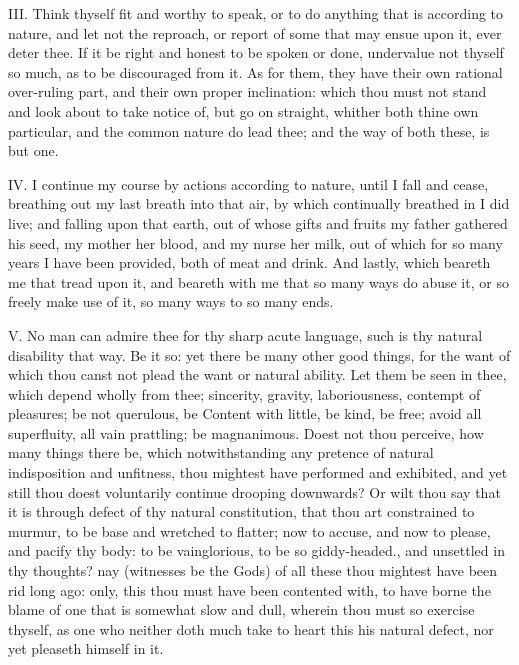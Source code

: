 III. Think thyself fit and worthy to speak, or to do anything that is
according to nature, and let not the reproach, or report of some that may
ensue upon it, ever deter thee. If it be right and honest to be spoken or
done, undervalue not thyself so much, as to be discouraged from it. As for
them, they have their own rational over-ruling part, and their own proper
inclination: which thou must not stand and look about to take notice of,
but go on straight, whither both thine own particular, and the common
nature do lead thee; and the way of both these, is but one.

IV. I continue my course by actions according to nature, until I
fall and cease, breathing out my last breath into that air, by which
continually breathed in I did live; and falling upon that earth, out of
whose gifts and fruits my father gathered his seed, my mother her blood,
and my nurse her milk, out of which for so many years I have been
provided, both of meat and drink. And lastly, which beareth me that tread
upon it, and beareth with me that so many ways do abuse it, or so freely
make use of it, so many ways to so many ends.

V. No man can admire thee for thy sharp acute language, such is thy
natural disability that way. Be it so: yet there be many other good
things, for the want of which thou canst not plead the want or natural
ability. Let them be seen in thee, which depend wholly from thee;
sincerity, gravity, laboriousness, contempt of pleasures; be not
querulous, be Content with little, be kind, be free; avoid all
superfluity, all vain prattling; be magnanimous. Doest not thou perceive,
how many things there be, which notwithstanding any pretence of natural
indisposition and unfitness, thou mightest have performed and exhibited,
and yet still thou doest voluntarily continue drooping downwards? Or wilt
thou say that it is through defect of thy natural constitution, that thou
art constrained to murmur, to be base and wretched to flatter; now to
accuse, and now to please, and pacify thy body: to be vainglorious, to be
so giddy-headed., and unsettled in thy thoughts? nay (witnesses be the
Gods) of all these thou mightest have been rid long ago: only, this thou
must have been contented with, to have borne the blame of one that is
somewhat slow and dull, wherein thou must so exercise thyself, as one who
neither doth much take to heart this his natural defect, nor yet pleaseth
himself in it.

